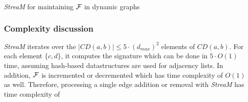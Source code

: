 \documentclass{article}
\begin{document}
\begin{algorithm}[!htb]
	\caption{\emph{StreaM} for maintaining ${\cal F}$ in dynamic graphs}
	\label{alg:u}
\end{algorithm}





\subsubsection{Complexity discussion}

\emph{StreaM} iterates over the $|CD(a,b)| \leq 5 \cdot (d_{max})^2$ elements of $CD(a,b)$.
For each element $\{c,d\}$, it computes the signature which can be done in $5 \cdot O(1)$ time, assuming hash-based datastructures are used for adjacency lists.
In addition, ${\cal F}$ is incremented or decremented which has time complexity of $O(1)$ as well.
Therefore, processing a single edge addition or removal with \emph{StreaM} has time complexity of
\end{document}
